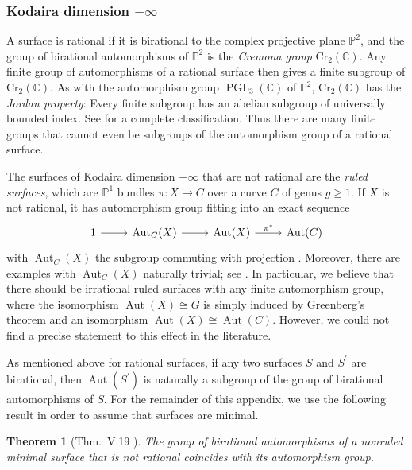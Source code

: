 \documentclass[11pt]{article}
\theoremstyle{plain}
\newtheorem*{thmnonum}{Theorem}
\theoremstyle{definition}
\theoremstyle{remark}
\newcommand{\bbC}{\mathbb{C}}
\newcommand{\bbP}{\mathbb{P}}
\DeclareMathOperator{\PGL}{PGL}
\DeclareMathOperator{\Aut}{Aut}
\begin{document}
\subsubsection*{Kodaira dimension $-\infty$}

A surface is rational if it is birational to the complex projective plane $\bbP^2$, and the group of birational automorphisms of $\bbP^2$ is the \emph{Cremona group} $\mathrm{Cr}_2(\bbC)$. Any finite group of automorphisms of a rational surface then gives a finite subgroup of $\mathrm{Cr}_2(\bbC)$. As with the automorphism group $\PGL_3(\bbC)$ of $\bbP^2$, $\mathrm{Cr}_2(\bbC)$ has the \emph{Jordan property}: Every finite subgroup has an abelian subgroup of universally bounded index. See \cite[\S4, \S5, \S10]{DolgachevIskovskikh} for a complete classification. Thus there are many finite groups that cannot even be subgroups of the automorphism group of a rational surface.

The surfaces of Kodaira dimension $-\infty$ that are not rational are the \emph{ruled surfaces}, which are $\bbP^1$ bundles $\pi : X \to C$ over a curve $C$ of genus $g \ge 1$. If $X$ is not rational, it has automorphism group fitting into an exact sequence
\begin{equation}\label{eq:RuledAut}
\begin{tikzcd} 1 \arrow[r] & \Aut_C(X) \arrow[r] & \Aut(X) \arrow[r, "\pi^*"] & \Aut(C) \end{tikzcd}
\end{equation}
with $\Aut_C(X)$ the subgroup commuting with projection \cite[Lem.\ 6]{Maruyama}. Moreover, there are examples with $\Aut_C(X)$ naturally trivial; see \cite[\S 2]{Maruyama}. In particular, we believe that there should be irrational ruled surfaces with any finite automorphism group, where the isomorphism $\Aut(X) \cong G$ is simply induced by Greenberg's theorem and an isomorphism $\Aut(X) \cong \Aut(C)$. However, we could not find a precise statement to this effect in the literature.

\medskip

As mentioned above for rational surfaces, if any two surfaces $S$ and $S^\prime$ are birational, then $\Aut(S^\prime)$ is naturally a subgroup of the group of birational automorphisms of $S$. For the remainder of this appendix, we use the following result in order to assume that surfaces are minimal.

\begin{thmnonum}[Thm.\ V.19 \cite{Beauville}]\label{thm:ToMinimal}
The group of birational automorphisms of a nonruled minimal surface that is not rational coincides with its automorphism group.
\end{thmnonum}
\end{document}
